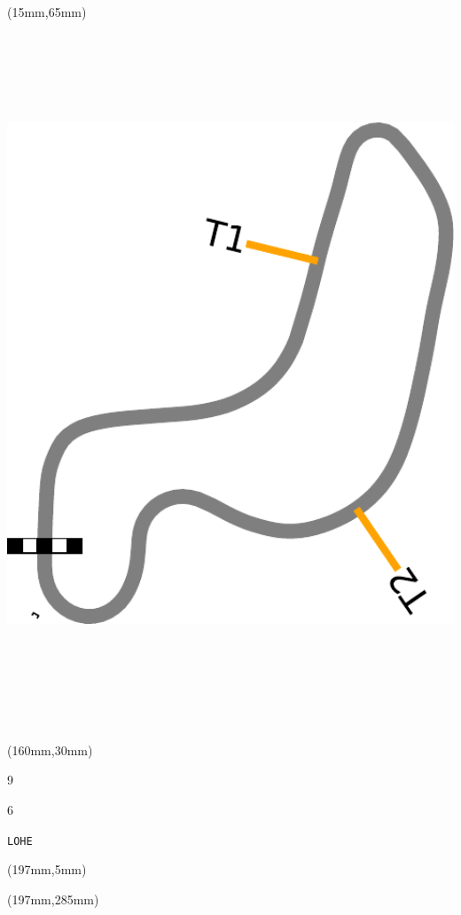 \begin{textblock*}{185mm}(15mm,65mm)%
\centering
\mbox{\includegraphics[width=185mm,height=210mm,keepaspectratio]{PT/LOHE.pdf}}
\end{textblock*}
\begin{textblock*}{40mm}(160mm,30mm)%
\Large
\par{} 
\par9 
\par6 
\par\hfill\tiny\tt LOHE\\
\end{textblock*}
\begin{textblock*}{20mm}(197mm,5mm)%
\fbox{\thepage}
\label{LOHE}
\end{textblock*}
\begin{textblock*}{20mm}(197mm,285mm)%
\fbox{\thepage}
\end{textblock*}

